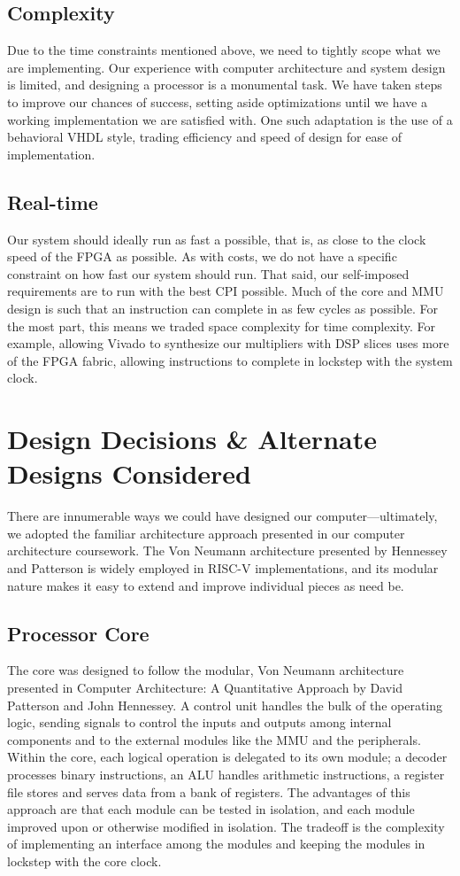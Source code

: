 \documentclass{article}
\begin{document}
\subsection{Complexity}
  Due to the time constraints mentioned above, we need to tightly scope what we are implementing.  Our experience with
  computer architecture and system design is limited, and designing a processor is a monumental task.  We have taken
  steps to improve our chances of success, setting aside optimizations until we have a working implementation we are
  satisfied with.  One such adaptation is the use of a behavioral VHDL style, trading efficiency and speed of design
  for ease of implementation.

\subsection{Real-time}
  Our system should ideally run as fast a possible, that is, as close to the clock speed of the FPGA as possible.
  As with costs, we do not have a specific constraint on how fast our system should run.  That said, our self-imposed
  requirements are to run with the best CPI possible.  Much of the core and MMU design is such that an instruction can
  complete in as few cycles as possible.  For the most part, this means we traded space complexity for time complexity.
  For example, allowing Vivado to synthesize our multipliers with DSP slices uses more of the FPGA fabric, allowing
  instructions to complete in lockstep with the system clock.

\section{Design Decisions \& Alternate Designs Considered}

There are innumerable ways we could have designed our computer---ultimately, we adopted the familiar architecture approach presented in our computer architecture coursework.  The Von Neumann architecture presented by Hennessey and Patterson is widely employed in RISC-V implementations, and its modular nature makes it easy to extend and improve individual pieces as need be.

\subsection{Processor Core}
The core was designed to follow the modular, Von Neumann architecture presented in Computer Architecture: A Quantitative Approach by David Patterson and John Hennessey.  A control unit handles the bulk of the operating logic, sending signals to control the inputs and outputs among internal components and to the external modules like the MMU and the peripherals.  Within the core, each logical operation is delegated to its own module; a decoder processes binary instructions, an ALU handles arithmetic instructions, a register file stores and serves data from a bank of registers.  The advantages of this approach are that each module can be tested in isolation, and each module improved upon or otherwise modified in isolation.  The tradeoff is the complexity of implementing an interface among the modules and keeping the modules in lockstep with the core clock.
\end{document}
